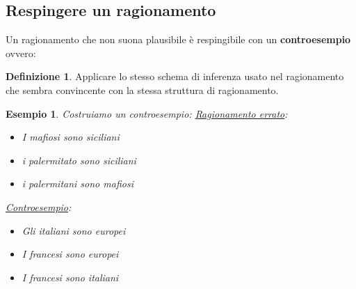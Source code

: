 \documentclass[../main.tex, class=article, 12pt]{subfiles}
\newtheorem{exmp}{Esempio}[section]
\theoremstyle{definition}
\newtheorem{definition}{Definizione}[section]
\begin{document}
\subsection{Respingere un ragionamento}
Un ragionamento che non suona plausibile è respingibile con un \textbf{controesempio} ovvero: \par
\begin{definition}
        Applicare lo stesso schema di inferenza usato nel ragionamento che sembra convincente con la stessa struttura di ragionamento.
\end{definition}
\begin{exmp}
        Costruiamo un controesempio: \newline
        \underline{Ragionamento errato}:
        \begin{itemize}
                \item I mafiosi sono siciliani
                \item i palermitato sono siciliani
                \item i palermitani sono mafiosi
        \end{itemize}

        \underline{Controesempio}:
        \begin{itemize}
                \item Gli italiani sono europei
                \item I francesi sono europei
                \item I francesi sono italiani 
        \end{itemize}
\end{exmp}
\end{document}
